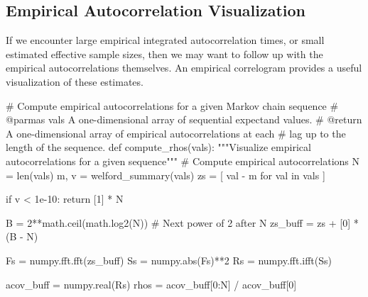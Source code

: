 \documentclass[
  letterpaper,
  DIV=11,
  numbers=noendperiod]{scrartcl}
\newenvironment{Shaded}{\begin{snugshade}}{\end{snugshade}}
\newcommand{\BuiltInTok}[1]{\textcolor[rgb]{0.00,0.23,0.31}{#1}}
\newcommand{\CommentTok}[1]{\textcolor[rgb]{0.37,0.37,0.37}{#1}}
\newcommand{\ControlFlowTok}[1]{\textcolor[rgb]{0.00,0.23,0.31}{#1}}
\newcommand{\DecValTok}[1]{\textcolor[rgb]{0.68,0.00,0.00}{#1}}
\newcommand{\FloatTok}[1]{\textcolor[rgb]{0.68,0.00,0.00}{#1}}
\newcommand{\KeywordTok}[1]{\textcolor[rgb]{0.00,0.23,0.31}{#1}}
\newcommand{\NormalTok}[1]{\textcolor[rgb]{0.00,0.23,0.31}{#1}}
\newcommand{\OperatorTok}[1]{\textcolor[rgb]{0.37,0.37,0.37}{#1}}
\begin{document}
\subsection{Empirical Autocorrelation
Visualization}\label{empirical-autocorrelation-visualization}

If we encounter large empirical integrated autocorrelation times, or
small estimated effective sample sizes, then we may want to follow up
with the empirical autocorrelations themselves. An empirical correlogram
provides a useful visualization of these estimates.

\begin{Shaded}
\begin{Highlighting}[]
\CommentTok{\# Compute empirical autocorrelations for a given Markov chain sequence}
\CommentTok{\# @parmas vals A one{-}dimensional array of sequential expectand values.}
\CommentTok{\# @return A one{-}dimensional array of empirical autocorrelations at each}
\CommentTok{\#         lag up to the length of the sequence.}
\KeywordTok{def}\NormalTok{ compute\_rhos(vals):}
  \CommentTok{"""Visualize empirical autocorrelations for a given sequence"""}
  \CommentTok{\# Compute empirical autocorrelations}
\NormalTok{  N }\OperatorTok{=} \BuiltInTok{len}\NormalTok{(vals)}
\NormalTok{  m, v }\OperatorTok{=}\NormalTok{ welford\_summary(vals)}
\NormalTok{  zs }\OperatorTok{=}\NormalTok{ [ val }\OperatorTok{{-}}\NormalTok{ m }\ControlFlowTok{for}\NormalTok{ val }\KeywordTok{in}\NormalTok{ vals ]}
  
  \ControlFlowTok{if}\NormalTok{ v }\OperatorTok{\textless{}} \FloatTok{1e{-}10}\NormalTok{:}
    \ControlFlowTok{return}\NormalTok{ [}\DecValTok{1}\NormalTok{] }\OperatorTok{*}\NormalTok{ N}
  
\NormalTok{  B }\OperatorTok{=} \DecValTok{2}\OperatorTok{**}\NormalTok{math.ceil(math.log2(N)) }\CommentTok{\# Next power of 2 after N}
\NormalTok{  zs\_buff }\OperatorTok{=}\NormalTok{ zs }\OperatorTok{+}\NormalTok{ [}\DecValTok{0}\NormalTok{] }\OperatorTok{*}\NormalTok{ (B }\OperatorTok{{-}}\NormalTok{ N)}
  
\NormalTok{  Fs }\OperatorTok{=}\NormalTok{ numpy.fft.fft(zs\_buff)}
\NormalTok{  Ss }\OperatorTok{=}\NormalTok{ numpy.}\BuiltInTok{abs}\NormalTok{(Fs)}\OperatorTok{**}\DecValTok{2}
\NormalTok{  Rs }\OperatorTok{=}\NormalTok{ numpy.fft.ifft(Ss)}
  
\NormalTok{  acov\_buff }\OperatorTok{=}\NormalTok{ numpy.real(Rs)}
\NormalTok{  rhos }\OperatorTok{=}\NormalTok{ acov\_buff[}\DecValTok{0}\NormalTok{:N] }\OperatorTok{/}\NormalTok{ acov\_buff[}\DecValTok{0}\NormalTok{]}
  

\end{Highlighting}
\end{Shaded}
\end{document}
